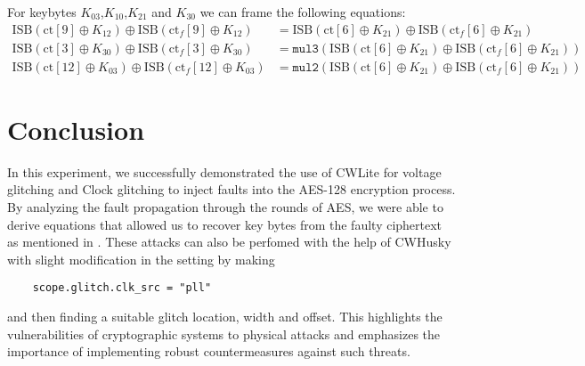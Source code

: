 For keybytes $K_{03}$,$K_{10}$,$K_{21}$ and $K_{30}$ we can frame the following equations:
\begin{align*}
    \text{ISB}(\text{ct}[9] \oplus K_{12}) \oplus \text{ISB}(\text{ct}_f[9] \oplus K_{12}) &= \text{ISB}(\text{ct}[6] \oplus K_{21}) \oplus \text{ISB}(\text{ct}_f[6] \oplus K_{21}) \\
    \text{ISB}(\text{ct}[3] \oplus K_{30}) \oplus \text{ISB}(\text{ct}_f[3] \oplus K_{30}) &= \texttt{mul3}\left( \text{ISB}(\text{ct}[6] \oplus K_{21}) \oplus \text{ISB}(\text{ct}_f[6] \oplus K_{21}) \right) \\
    \text{ISB}(\text{ct}[12] \oplus K_{03}) \oplus \text{ISB}(\text{ct}_f[12] \oplus K_{03}) &= \texttt{mul2}\left( \text{ISB}(\text{ct}[6] \oplus K_{21}) \oplus \text{ISB}(\text{ct}_f[6] \oplus K_{21}) \right)
    \end{align*}

\section{Conclusion}
In this experiment, we successfully demonstrated the use of CWLite for voltage glitching and Clock glitching to inject faults into the AES-128 encryption process. By analyzing the fault propagation through the rounds of AES, we were able to derive equations that allowed us to recover key bytes from the faulty ciphertext as mentioned in \cite{Saha2009ADF}. These attacks can also be perfomed with the help of CWHusky with slight modification in the setting by making 
\begin{verbatim}
    scope.glitch.clk_src = "pll"
\end{verbatim} 
and then finding a suitable glitch location, width and offset.
This highlights the vulnerabilities of cryptographic systems to physical attacks and emphasizes the importance of implementing robust countermeasures against such threats.

